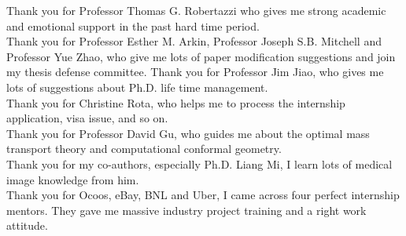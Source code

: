Thank you for Professor Thomas G. Robertazzi who gives me strong academic and emotional support in the past hard time period.  \\
Thank you for Professor Esther M. Arkin, Professor Joseph S.B. Mitchell and Professor Yue Zhao, who give me lots of paper modification suggestions and join my thesis defense committee.  Thank you for Professor Jim Jiao, who gives me lots of suggestions about Ph.D. life time management.\\ 
Thank you for Christine Rota, who helps me to process the internship application, visa issue, and so on.\\
Thank you for Professor David Gu, who guides me about the optimal mass transport theory and computational conformal geometry.\\
Thank you for my co-authors, especially Ph.D. Liang Mi, I learn lots of medical image knowledge from him.\\
Thank you for Ocoos, eBay, BNL and Uber, I came across four perfect internship mentors. They gave me massive industry project training and a right work attitude.\\